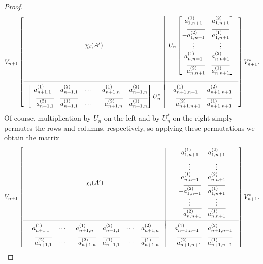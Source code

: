 \documentclass[11pt,reqno]{amsart}
\def\x{\chi}
\theoremstyle{definition}
\numberwithin{equation}{section}
\begin{document}
\begin{proof}
    \[
        V_{n+1} \left[\begin{array}{c|c} \x_i(A') & U_n \begin{bmatrix}a_{1,n+1}^{(1)} & a_{1,n+1}^{(2)} \\[6pt] -\overline{a_{1,n+1}^{(2)}} & \overline{a_{1,n+1}^{(1)}} \\ \vdots & \vdots \\ a_{n,n+1}^{(1)} & a_{n,n+1}^{(2)} \\[6pt] -\overline{a_{n,n+1}^{(2)}} & \overline{a_{n,n+1}^{(1)}} \end{bmatrix} \\[50pt] \hline \\[-8pt] \begin{bmatrix}a_{n+1,1}^{(1)} & a_{n+1,1}^{(2)} & \cdots & a_{n+1,n}^{(1)} & a_{n+1,n}^{(2)} \\[6pt] -\overline{a_{n+1,1}^{(2)}} & \overline{a_{n+1,1}^{(1)}} & \cdots & -\overline{a_{n+1,n}^{(2)}} & \overline{a_{n+1,n}^{(1)}}\end{bmatrix} U_n^* & \begin{array}{cc} a_{n+1,n+1}^{(1)} & a_{n+1,n+1}^{(2)} \\[6pt] -\overline{a_{n+1,n+1}^{(2)}} & \overline{a_{n+1, n+1}^{(1)}}\end{array} \end{array}\right] V_{n+1}^*.
    \]
    Of course, multiplication by \(U_n\) on the left and by \(U_n^*\) on the right simply permutes the rows and columns, respectively, so applying these permutations we obtain the matrix
    \[
        V_{n+1} \left[\begin{array}{c|c} \x_i(A') & \begin{array}{cc} a_{1,n+1}^{(1)} & a_{1,n+1}^{(2)} \\[6pt] \vdots & \vdots \\ a_{n,n+1}^{(1)} & a_{n,n+1}^{(2)} \\[6pt] -\overline{a_{1,n+1}^{(2)}} & \overline{a_{1,n+1}^{(1)}} \\ \vdots & \vdots \\ -\overline{a_{n,n+1}^{(2)}} & \overline{a_{n,n+1}^{(1)}} \end{array} \\[10pt] \\[-8pt] \hline \\[-8pt] \begin{array}{cccccc} a_{n+1,1}^{(1)} & \cdots &  a_{n+1,n}^{(1)} & a_{n+1,1}^{(2)} & \cdots & a_{n+1,n}^{(2)} \\[6pt] -\overline{a_{n+1,1}^{(2)}} & \cdots & -\overline{a_{n+1,n}^{(2)}} & \overline{a_{n+1,1}^{(1)}} & \cdots & \overline{a_{n+1,n}^{(1)}}\end{array} & \begin{array}{cc} a_{n+1,n+1}^{(1)} & a_{n+1,n+1}^{(2)} \\[6pt] -\overline{a_{n+1,n+1}^{(2)}} & \overline{a_{n+1, n+1}^{(1)}}\end{array} \end{array}\right] V_{n+1}^*.
    \]


\end{proof}
\end{document}
